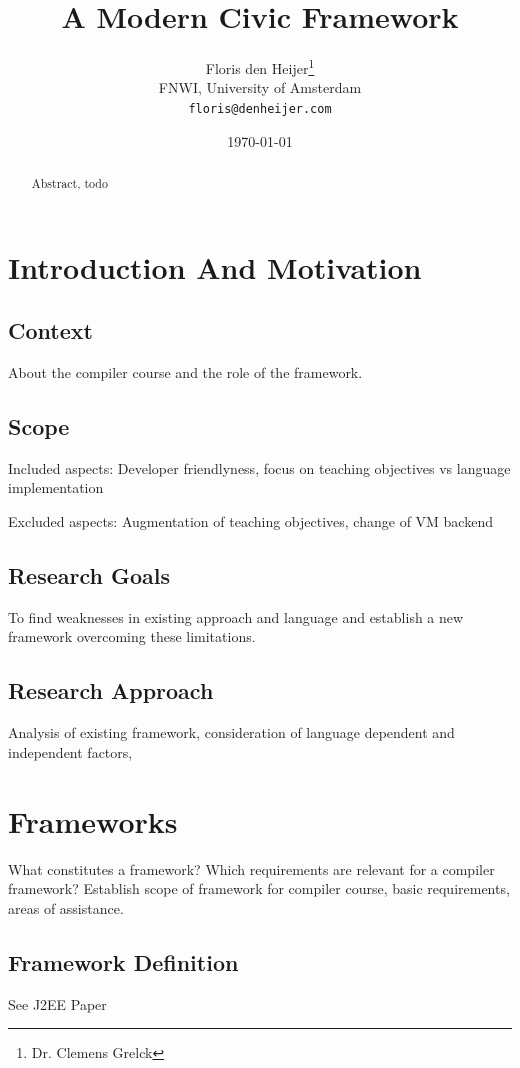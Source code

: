 \documentclass[final,a4paper,12pt]{article}
\title{A Modern Civic Framework}
\author{Floris den Heijer\thanks{Dr. Clemens Grelck}\\
	FNWI, University of Amsterdam\\
	\texttt{floris@denheijer.com}}
\date{\today}
\begin{document}
	
\maketitle
\begin{abstract}
	Abstract, todo
\end{abstract}
\clearpage

\setcounter{tocdepth}{3}
\setcounter{secnumdepth}{3}
\tableofcontents
\clearpage

\section{Introduction And Motivation}
\subsection{Context}
About the compiler course and the role of the framework.
\subsection{Scope}
Included aspects: Developer friendlyness, focus on teaching objectives vs language implementation

Excluded aspects: Augmentation of teaching objectives, change of VM backend
\subsection{Research Goals}
To find weaknesses in existing approach and language and establish a new framework overcoming these limitations.
\subsection{Research Approach}
Analysis of existing framework, consideration of language dependent and independent factors, 





\section{Frameworks}
What constitutes a framework? Which requirements are relevant for a compiler framework? Establish scope of framework for compiler course, basic requirements, areas of assistance.
\subsection{Framework Definition}
See J2EE Paper
\end{document}
